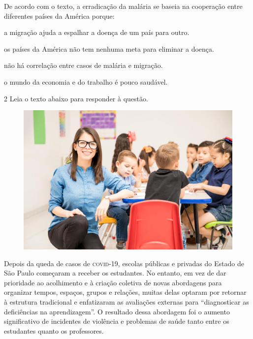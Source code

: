 De acordo com o texto, a erradicação da malária se baseia na cooperação entre diferentes países 
da América porque:

\begin{escolha}

  \item a migração ajuda a espalhar a doença de um país para outro.

  \item os países da América não tem nenhuma meta para eliminar a doença.

  \item não há correlação entre casos de malária e migração. 

  \item o mundo da economia e do trabalho é pouco saudável.

\end{escolha}

\num{2} Leia o texto abaixo para responder à questão.

\begin{myquote}

\begin{figure}[H]
\centering
\includegraphics[scale=0.35]{./imgSAEB_7_POR/media/image27.png}
\end{figure}

Depois da queda de casos de \textsc{covid}-19, escolas públicas e privadas 
do Estado de São Paulo começaram a receber os estudantes. No entanto, em vez 
de dar prioridade ao acolhimento e à criação coletiva de novas abordagens para
organizar tempos, espaços, grupos e relações, muitas delas optaram por retornar 
à estrutura tradicional e enfatizaram as avaliações externas para ``diagnosticar 
as deficiências na aprendizagem''. O resultado dessa abordagem foi o aumento 
significativo de incidentes de violência e problemas de saúde tanto entre os
estudantes quanto os professores.

\end{myquote}

